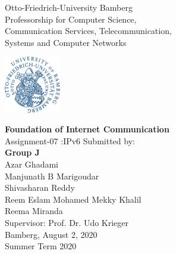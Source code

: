 \thispagestyle{empty}
\begin{center}
\begin{minipage}{0.7\textwidth}
\centering
\footnotesize{Otto-Friedrich-University Bamberg}\\
	\vspace{0.3cm}
\normalsize{Professorship for Computer Science,
	\\Communication Services, Telecommunication,
 	\\Systems and Computer Networks}
\end{minipage}
\begin{minipage}{0.1\textwidth}\raggedleft
\includegraphics[width=70pt]{images/UMI-LOGO.png}
\end{minipage}




	


	\vspace{1cm}
	\doublespacing
	{\textbf{Foundation of Internet Communication}}\\
	\singlespacing
	{\normalsize{Assignment-07 :IPv6}}
    \vfill
    \footnotesize{Submitted by:}\\
    \textbf{Group J}\\
    \vspace{0.5cm}
     \normalsize{Azar Ghadami}\\
     \normalsize{Manjunath B Marigoudar}\\
     \normalsize{Shivasharan Reddy}\\
     \normalsize{Reem Eslam Mohamed Mekky Khalil}\\
     \normalsize{Reema Miranda}\\
     

     \vspace{0.5cm}
     \small{Supervisor: Prof. Dr. Udo Krieger}\\
     \vspace{0.5cm}
     \footnotesize{Bamberg, August 2, 2020}\\
    \footnotesize{Summer Term 2020}
 

 
\end{center}
\clearpage

\clearpage
